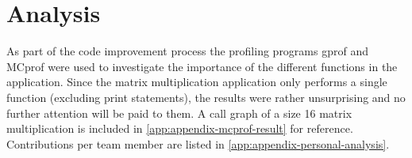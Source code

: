 \documentclass[final]{article}
\begin{document}
\section{Analysis}
As part of the code improvement process the profiling programs gprof and MCprof were used to investigate the importance of the different functions in the application.
Since the matrix multiplication application only performs a single function (excluding print statements), the results were rather unsurprising and no further attention will be paid to them.
A call graph of a size 16 matrix multiplication is included in \cref{app:appendix-mcprof-result} for reference.
Contributions per team member are listed in \cref{app:appendix-personal-analysis}.
\end{document}
